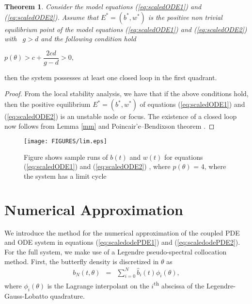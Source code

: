 \documentclass[review]{elsarticle}
\newtheorem{theorem}{Theorem}[section]
\begin{document}
\begin{theorem}
   Consider the model equations (\ref{eq:scaledODE1}) and
  (\ref{eq:scaledODE2}). Assume that $E^{\ast }=(b^{\ast },w^{\ast })$
  is the positive non trivial equilibrium point of the model equations
  (\ref{eq:scaledODE1}) and (\ref{eq:scaledODE2}) with \ $g>d$ and the
  following condition hold
\end{theorem}

\begin{center}
$%
p(\theta )>c+\dfrac{2cd}{g-d}>0,$
\end{center}

then the system possesses at least one closed loop in the first quadrant.

\begin{proof}
  From the local stability analysis, we have that if the above
  conditions hold, then the positive equilibrium
  $E^{\ast }=(b^{\ast },w^{\ast })$ of equations (\ref{eq:scaledODE1})
  and (\ref{eq:scaledODE2}) is an unstable node or focus. The
  existence of a closed loop now follows from Lemma \ref{mm} and
  Poincair'e--Bendixson theorem \cite{nonlinearChaos}.
\end{proof}

\begin{figure}[!htp]
\begin{center}
\texttt{[image: FIGURES/lim.eps]}  

\end{center}

\caption{Figure shows sample runs of $b(t)$ and $w(t)$ for equations
  (\ref{eq:scaledODE1}) and (\ref{eq:scaledODE2}) , where
  $p(\theta )$ = 4, where the system has a limit cycle }
      \label{fig:lim}
\end{figure}


\section{Numerical Approximation}
\label{numericalApproximation}

We introduce the method for the numerical approximation of the coupled
PDE and ODE system in equations (\ref{eq:scaledodePDE1}) and
(\ref{eq:scaledodePDE2}). For the full system, we make use of a
Legendre pseudo-spectral collocation
method\cite{spectralMethodsFluids,hesthaven_gottlieb_gottlieb_2007,gottlieb1977numerical}. First,
the butterfly density is discretized in $\theta$ as
\begin{eqnarray}
  \label{eqn:spatialDiscretization}
  b_N(t,\theta) & = & \sum^N_{i=0} \hat{b}_i(t) \phi_i(\theta),
\end{eqnarray}
where $\phi_i(\theta)$ is the Lagrange interpolant on the
$i$\textsuperscript{th} abscissa of the Legendre-Gauss-Lobatto
quadrature\cite{hesthaven_gottlieb_gottlieb_2007}.
\end{document}
